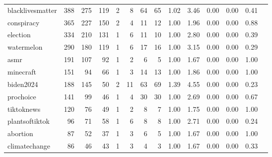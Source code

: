 \begin{tabular}{l|rrrrr|rrrrrrrr}
    blacklivesmatter &    388 &    275 &                        119 &   2 &      8 &     64 &     65 & 1.02 &   3.46 &   0.00 &         0.00 &                                0.41 \\
          conspiracy &    365 &    227 &                        150 &   2 &      4 &     11 &     12 & 1.00 &   1.96 &   0.00 &         0.00 &                                0.88 \\
            election &    334 &    210 &                        131 &   1 &      6 &     11 &     10 & 1.00 &   2.80 &   0.00 &         0.00 &                                0.39 \\
          watermelon &    290 &    180 &                        119 &   1 &      6 &     17 &     16 & 1.00 &   3.15 &   0.00 &         0.00 &                                0.29 \\
                asmr &    191 &    107 &                         92 &   1 &      2 &      6 &      5 & 1.00 &   1.67 &   0.00 &         0.00 &                                1.00 \\
           minecraft &    151 &     94 &                         66 &   1 &      3 &     14 &     13 & 1.00 &   1.86 &   0.00 &         0.00 &                                1.00 \\
           biden2024 &    188 &    145 &                         50 &   2 &     11 &     63 &     69 & 1.39 &   4.55 &   0.00 &         0.00 &                                0.23 \\
           prochoice &    141 &     99 &                         46 &   1 &      4 &     30 &     30 & 1.00 &   2.69 &   0.00 &         0.00 &                                0.67 \\
          tiktoknews &    120 &     76 &                         49 &   1 &      2 &      8 &      7 & 1.00 &   1.75 &   0.00 &         0.00 &                                1.00 \\
      plantsoftiktok &     96 &     71 &                         58 &   1 &      6 &      8 &      8 & 1.00 &   2.71 &   0.00 &         0.00 &                                0.24 \\
            abortion &     87 &     52 &                         37 &   1 &      3 &      6 &      5 & 1.00 &   1.67 &   0.00 &         0.00 &                                1.00 \\
       climatechange &     86 &     46 &                         43 &   1 &      3 &      4 &      3 & 1.00 &   1.67 &   0.00 &         0.00 &                                0.33 \\

\end{tabular}
